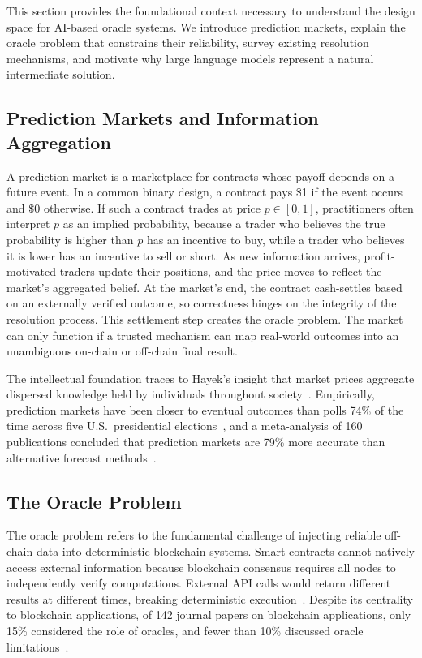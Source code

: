 This section provides the foundational context necessary to understand the design space for AI-based oracle systems. We introduce prediction markets, explain the oracle problem that constrains their reliability, survey existing resolution mechanisms, and motivate why large language models represent a natural intermediate solution.

\subsection{Prediction Markets and Information Aggregation}

A prediction market is a marketplace for contracts whose payoff depends on a future event. In a common binary design, a contract pays \$1 if the event occurs and \$0 otherwise. If such a contract trades at price $p \in [0, 1]$, practitioners often interpret $p$ as an implied probability, because a trader who believes the true probability is higher than $p$ has an incentive to buy, while a trader who believes it is lower has an incentive to sell or short. As new information arrives, profit-motivated traders update their positions, and the price moves to reflect the market's aggregated belief. At the market's end, the contract cash-settles based on an externally verified outcome, so correctness hinges on the integrity of the resolution process. This settlement step creates the oracle problem. The market can only function if a trusted mechanism can map real-world outcomes into an unambiguous on-chain or off-chain final result.

The intellectual foundation traces to Hayek's insight that market 
prices aggregate dispersed knowledge held by individuals throughout 
society~\cite{hayek1945use,arrow2008promise}. Empirically, prediction 
markets have been closer to eventual outcomes than polls 74\% of the 
time across five U.S.\ presidential elections~\cite{berg2008prediction}, 
and a meta-analysis of 160 publications concluded that prediction 
markets are 79\% more accurate than alternative forecast 
methods~\cite{iceb2020meta}.


\subsection{The Oracle Problem}

The oracle problem refers to the fundamental challenge of injecting reliable 
off-chain data into deterministic blockchain systems. Smart contracts cannot 
natively access external information because blockchain consensus requires 
all nodes to independently verify computations. External API calls would 
return different results at different times, breaking deterministic 
execution~\cite{ellis2017chainlink, caldarelli2020oracle}. Despite its 
centrality to blockchain applications, of 142 journal papers on blockchain 
applications, only 15\% considered the role of oracles, and fewer than 
10\% discussed oracle limitations~\cite{caldarelli2020oracle}.

